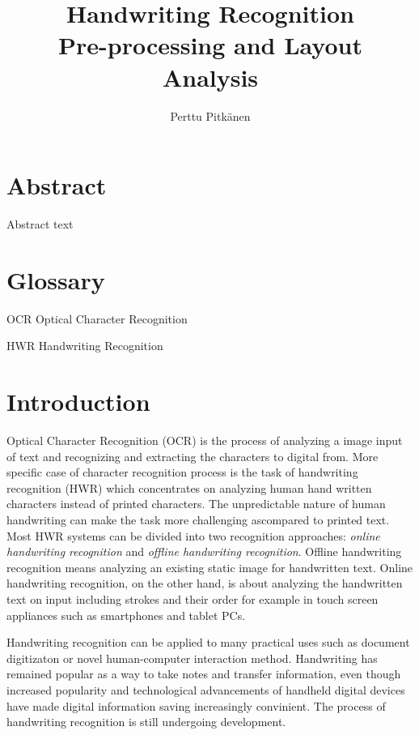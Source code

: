 \documentclass{article}
\title{%
  Handwriting Recognition \\
  \large Pre-processing and Layout Analysis}
\author{Perttu Pitk{\"a}nen}
\begin{document}
 \maketitle

 \newpage
 \section*{Abstract}

  Abstract text


 \newpage
 \tableofcontents


 \newpage
 \section*{Glossary}

  OCR Optical Character Recognition

  HWR Handwriting Recognition

 \newpage
 \section{Introduction}
  Optical Character Recognition (OCR) is the process of analyzing a image input of  text and recognizing and extracting the characters to digital from. More specific case of character recognition process is the task of handwriting recognition (HWR) which concentrates on analyzing human hand written characters instead of printed characters. The unpredictable nature of human handwriting can make the task more challenging ascompared to printed text. Most HWR systems can be divided into two recognition approaches: \textit{online handwriting recognition} and \textit{offline handwriting recognition}. Offline handwriting recognition means analyzing an existing static image for handwritten text. Online handwriting recognition, on the other hand, is about analyzing the handwritten text on input including strokes and their order for example in touch screen appliances such as smartphones and tablet PCs.

  Handwriting recognition can be applied to many practical uses such as document digitizaton or novel human-computer interaction method. Handwriting has remained popular as a way to take notes and transfer information, even though increased popularity and technological advancements of handheld digital devices have made digital information saving increasingly convinient. The process of handwriting recognition is still undergoing development.
\end{document}
